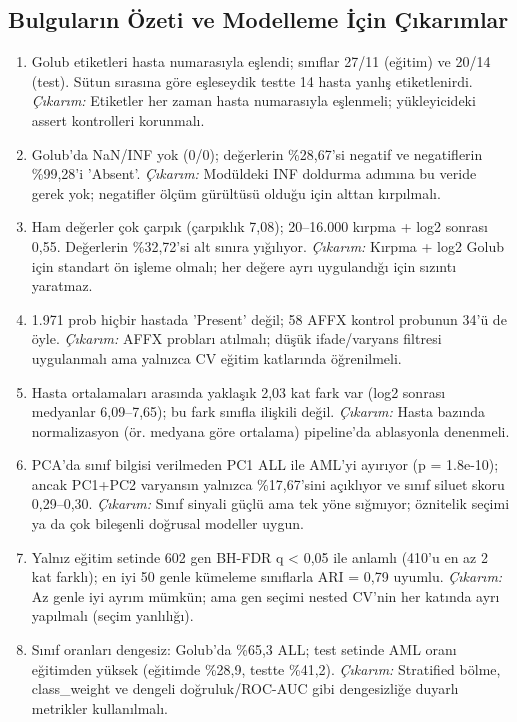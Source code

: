 \subsection{Bulguların Özeti ve Modelleme İçin Çıkarımlar}
\begin{enumerate}[leftmargin=*]
  \item Golub etiketleri hasta numarasıyla eşlendi; sınıflar 27/11 (eğitim) ve 20/14 (test). Sütun sırasına göre eşleseydik testte 14 hasta yanlış etiketlenirdi. \textit{Çıkarım:} Etiketler her zaman hasta numarasıyla eşlenmeli; yükleyicideki assert kontrolleri korunmalı.
  \item Golub'da NaN/INF yok (0/0); değerlerin \%28,67'si negatif ve negatiflerin \%99,28'i 'Absent'. \textit{Çıkarım:} Modüldeki INF doldurma adımına bu veride gerek yok; negatifler ölçüm gürültüsü olduğu için alttan kırpılmalı.
  \item Ham değerler çok çarpık (çarpıklık 7,08); 20–16.000 kırpma + log2 sonrası 0,55. Değerlerin \%32,72'si alt sınıra yığılıyor. \textit{Çıkarım:} Kırpma + log2 Golub için standart ön işleme olmalı; her değere ayrı uygulandığı için sızıntı yaratmaz.
  \item 1.971 prob hiçbir hastada 'Present' değil; 58 AFFX kontrol probunun 34'ü de öyle. \textit{Çıkarım:} AFFX probları atılmalı; düşük ifade/varyans filtresi uygulanmalı ama yalnızca CV eğitim katlarında öğrenilmeli.
  \item Hasta ortalamaları arasında yaklaşık 2,03 kat fark var (log2 sonrası medyanlar 6,09–7,65); bu fark sınıfla ilişkili değil. \textit{Çıkarım:} Hasta bazında normalizasyon (ör. medyana göre ortalama) pipeline'da ablasyonla denenmeli.
  \item PCA'da sınıf bilgisi verilmeden PC1 ALL ile AML'yi ayırıyor (p = 1.8e-10); ancak PC1+PC2 varyansın yalnızca \%17,67'sini açıklıyor ve sınıf siluet skoru 0,29–0,30. \textit{Çıkarım:} Sınıf sinyali güçlü ama tek yöne sığmıyor; öznitelik seçimi ya da çok bileşenli doğrusal modeller uygun.
  \item Yalnız eğitim setinde 602 gen BH-FDR q < 0,05 ile anlamlı (410'u en az 2 kat farklı); en iyi 50 genle kümeleme sınıflarla ARI = 0,79 uyumlu. \textit{Çıkarım:} Az genle iyi ayrım mümkün; ama gen seçimi nested CV'nin her katında ayrı yapılmalı (seçim yanlılığı).
  \item Sınıf oranları dengesiz: Golub'da \%65,3 ALL; test setinde AML oranı eğitimden yüksek (eğitimde \%28,9, testte \%41,2). \textit{Çıkarım:} Stratified bölme, class\_weight ve dengeli doğruluk/ROC-AUC gibi dengesizliğe duyarlı metrikler kullanılmalı.

\end{enumerate}
